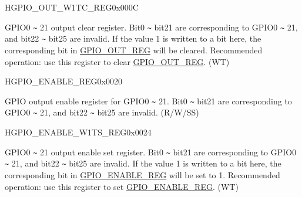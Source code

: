 \begin{register}{H}{GPIO\_OUT\_W1TC\_REG}{0x000C}\label{regdesc:GPIOOUTW1TCREG}
%
%
\regnewline%
\begin{regdesc}\begin{reglist}
\label{fielddesc:GPIOOUTW1TC}\item [GPIO\_OUT\_W1TC] GPIO0 \verb+~+ 21 output clear register. Bit0 \verb+~+ bit21 are corresponding to GPIO0 \verb+~+ 21, and bit22 \verb+~+ bit25 are invalid. If the value 1 is written to a bit here, the corresponding bit in \hyperref[regdesc:GPIOOUTREG]{GPIO\_OUT\_REG} will be cleared. Recommended operation: use this register to clear \hyperref[regdesc:GPIOOUTREG]{GPIO\_OUT\_REG}. (WT)
\end{reglist}\end{regdesc}
\end{register}




\begin{register}{H}{GPIO\_ENABLE\_REG}{0x0020}\label{regdesc:GPIOENABLEREG}
%
%
\regnewline%
\begin{regdesc}\begin{reglist}
\label{fielddesc:GPIOENABLEDATA}\item [GPIO\_ENABLE\_DATA] GPIO output enable register for GPIO0 \verb+~+ 21. Bit0 \verb+~+ bit21 are corresponding to GPIO0 \verb+~+ 21, and bit22 \verb+~+ bit25 are invalid. (R/W/SS)
\end{reglist}\end{regdesc}
\end{register}


\begin{register}{H}{GPIO\_ENABLE\_W1TS\_REG}{0x0024}\label{regdesc:GPIOENABLEW1TSREG}
%
%
\regnewline%
\begin{regdesc}\begin{reglist}
\label{fielddesc:GPIOENABLEW1TS}\item [GPIO\_ENABLE\_W1TS] GPIO0 \verb+~+ 21 output enable set register. Bit0 \verb+~+ bit21 are corresponding to GPIO0 \verb+~+ 21, and bit22 \verb+~+ bit25 are invalid. If the value 1 is written to a bit here, the corresponding bit in \hyperref[regdesc:GPIOENABLEREG]{GPIO\_ENABLE\_REG} will be set to 1. Recommended operation: use this register to set \hyperref[regdesc:GPIOENABLEREG]{GPIO\_ENABLE\_REG}. (WT)
\end{reglist}\end{regdesc}
\end{register}


